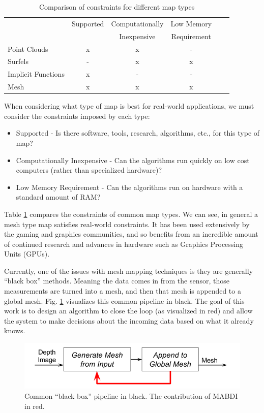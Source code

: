 \begin{table}[h]
  \caption{Comparison of constraints for different map types}
  \label{tab:rep}
  \begin{footnotesize}
  \begin{center}
    \begin{tabular}{|l|c|c|c|c|c|}
    \hline
    \multirow{2}{*}{} & Supported & Computationally & Low Memory \\
     & & Inexpensive & Requirement \\\hline
    Point Clouds		& x & x & - \\
    Surfels             	& - & x & x \\
    Implicit Functions 	& x & - & - \\
    Mesh	 	& x & x & x \\
    \hline
    \end{tabular}
  \end{center}
  \end{footnotesize}
\end{table}

When considering what type of map is best for real-world applications, we must
consider the constraints imposed by each type:

\begin{itemize}
  \item Supported - Is there software, tools, research, algorithms, etc., for
  this type of map?
  \item Computationally Inexpensive - Can the algorithms run quickly on low cost
  computers (rather than specialized hardware)?
  \item Low Memory Requirement - Can the algorithms run on hardware with
  a standard amount of RAM?
\end{itemize}

Table \ref{tab:rep} compares the constraints of common map types. We can see, in
general a mesh type map satisfies real-world constraints. It has been used
extensively by the gaming and graphics communities, and so benefits from an
incredible amount of continued research and advances in hardware such as
Graphics Processing Units (GPUs).

Currently, one of the issues with mesh mapping techniques is they are generally
``black box'' methods. Meaning the data comes in from the sensor, those
measurements are turned into a mesh, and then that mesh is appended to a global
mesh. Fig. \ref{fig:pipeline} visualizes this common pipeline in black. The goal
of this work is to design an algorithm to close the loop (as visualized in red)
and allow the system to make decisions about the incoming data based on what it
already knows.

\begin{figure}[h]%
\centering
\includegraphics[width=.5\textwidth]{figures/diagram_general_pipeline.png}
\caption{Common ``black box'' pipeline in black. The contribution of MABDI in red.}
\label{fig:pipeline}
\end{figure}
